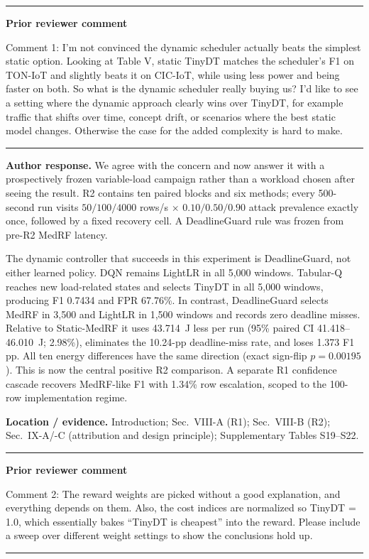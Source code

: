 \documentclass[11pt]{article}
\newenvironment{qbox}
    {\par\vspace{4pt}\noindent\begin{minipage}{\linewidth}\rule{\linewidth}{0.4pt}\par\noindent\textbf{Prior reviewer comment}\par\noindent}
    {\par\rule{\linewidth}{0.4pt}\end{minipage}\par\vspace{4pt}}
\begin{document}
\begin{qbox}
Comment 1: I'm not convinced the dynamic scheduler actually beats the simplest static option. Looking at Table V, static TinyDT matches the scheduler's F1 on TON-IoT and slightly beats it on CIC-IoT, while using less power and being faster on both. So what is the dynamic scheduler really buying us? I'd like to see a setting where the dynamic approach clearly wins over TinyDT, for example traffic that shifts over time, concept drift, or scenarios where the best static model changes. Otherwise the case for the added complexity is hard to make.
\end{qbox}

\textbf{Author response.} We agree with the concern and now answer it with a prospectively frozen variable-load campaign rather than a workload chosen after seeing the result. R2 contains ten paired blocks and six methods; every 500-second run visits $50/100/4000$ rows/s $\times$ $0.10/0.50/0.90$ attack prevalence exactly once, followed by a fixed recovery cell. A DeadlineGuard rule was frozen from pre-R2 MedRF latency.

The dynamic controller that succeeds in this experiment is DeadlineGuard, not either learned policy. DQN remains LightLR in all 5{,}000 windows. Tabular-Q reaches new load-related states and selects TinyDT in all 5{,}000 windows, producing F1 0.7434 and FPR 67.76\%. In contrast, DeadlineGuard selects MedRF in 3{,}500 and LightLR in 1{,}500 windows and records zero deadline misses. Relative to Static-MedRF it uses 43.714~J less per run (95\% paired CI 41.418--46.010~J; 2.98\%), eliminates the 10.24-pp deadline-miss rate, and loses 1.373 F1 pp. All ten energy differences have the same direction (exact sign-flip $p=0.00195$). This is now the central positive R2 comparison. A separate R1 confidence cascade recovers MedRF-like F1 with 1.34\% row escalation, scoped to the 100-row implementation regime.

\textbf{Location / evidence.} Introduction; Sec.~VIII-A (R1); Sec.~VIII-B (R2); Sec.~IX-A/-C (attribution and design principle); Supplementary Tables S19--S22.

\begin{qbox}
Comment 2: The reward weights are picked without a good explanation, and everything depends on them. Also, the cost indices are normalized so TinyDT = 1.0, which essentially bakes ``TinyDT is cheapest'' into the reward. Please include a sweep over different weight settings to show the conclusions hold up.
\end{qbox}
\end{document}
